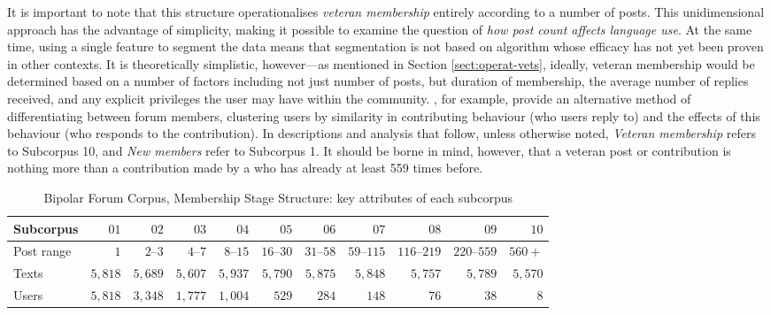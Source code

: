 It is important to note that this structure operationalises \emph{veteran membership} entirely according to a  number of \glspl{post}. This unidimensional approach has the advantage of simplicity, making it possible to examine the question of \emph{how \gls{post} count affects language use}. At the same time, using a single feature to segment the data means that segmentation is not based on algorithm whose efficacy has not yet been proven in other contexts. It is theoretically simplistic, however---as mentioned in Section \ref{sect:operat-vets}, ideally, veteran membership would be determined based on a number of factors including not just number of \glspl{post}, but duration of membership, the average number of replies received, and any explicit privileges the user may have within the community. \textcite{pfeil_social_2011}, for example, provide an alternative method of differentiating between \gls{forum} members, clustering users by similarity in contributing behaviour (who users reply to) and the effects of this behaviour (who responds to the contribution). In descriptions and analysis that follow, unless otherwise noted, \emph{Veteran membership} refers to Subcorpus 10, and \emph{New members} refer to Subcorpus 1. It should be borne in mind, however, that a veteran \gls{post} or contribution is nothing more than a contribution made by a  who has already  at least 559 times before.

\begin{table}[htb]
\centering
\footnotesize
\begin{tabularx}{1\textwidth}{Xrrrrrrrrrr}

\toprule
Subcorpus & $01$ & $02$ & $03$ & $04$ & $05$ & $06$ & $07$ & $08$ & $09$ & $10$ \\ \midrule
Post range & $1    $      &  $ 2\mbox{--}3  $   & $4\mbox{--}7 $    & $8\mbox{--}15$    & $16\mbox{--}30$ & $31\mbox{--}58$   &  $59\mbox{--}115$  & $116\mbox{--}219$ & $220\mbox{--}559$  & $560+$  \\
Texts      & $5,818$      &  $ 5,689 $   & $5,607$    & $5,937 $    & $5,790 $ & $5,875 $   &  $5,848  $  & $5,757   $ & $5,789$    & $5,570$ \\
Users     &  $5,818$      &  $ 3,348 $   & $1,777$    & $1,004$    & $ 529  $ & $284   $   &  $148    $  & $76      $ & $38$       &   $8$ \\ \bottomrule
\end{tabularx}
\caption[Membership Stage Structure: subcorpus attributes]{Bipolar Forum Corpus, Membership Stage Structure: key attributes of each subcorpus}
\label{tab:p_stats}
\end{table}


